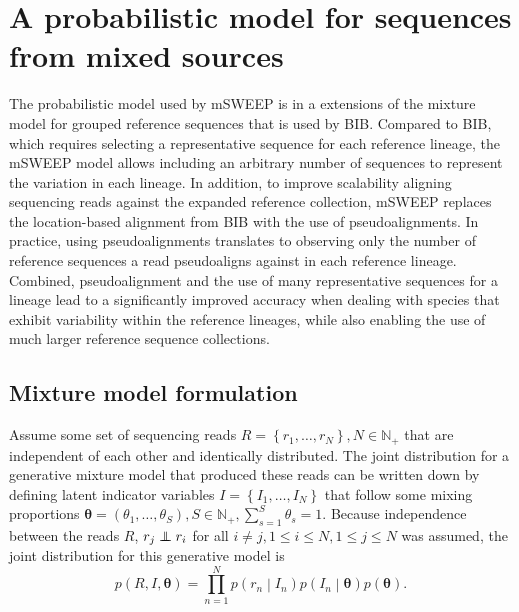\documentclass[officiallayout]{tktla}
\newcommand\indept{\protect\mathpalette{\protect\independenT}{\perp}}
\def\independenT#1#2{\mathrel{\rlap{$#1#2$}\mkern2mu{#1#2}}}
\begin{document}
\section{A probabilistic model for sequences from mixed sources}
\label{section:model}

The probabilistic model used by mSWEEP is in a extensions of the
mixture model for grouped reference sequences that is used by
BIB. Compared to BIB, which requires selecting a representative
sequence for each reference lineage, the mSWEEP model allows including
an arbitrary number of sequences to represent the variation in each
lineage. In addition, to improve scalability aligning sequencing reads
against the expanded reference collection, mSWEEP replaces the
location-based alignment from BIB with the use of pseudoalignments. In
practice, using pseudoalignments translates to observing only the
number of reference sequences a read pseudoaligns against in each
reference lineage. Combined, pseudoalignment and the use of many
representative sequences for a lineage lead to a significantly
improved accuracy when dealing with species that exhibit variability
within the reference lineages, while also enabling the use of much
larger reference sequence collections.

\subsection{Mixture model formulation}

Assume some set of sequencing reads $R = \left\{r_{1}, \dots,
r_{N}\right\}, N \in \mathbb{N}_{+}$ that are independent of each
other and identically distributed. The joint distribution for a
generative mixture model that produced these reads can be written down
by defining latent indicator variables $I = \left\{I_{1}, \dots,
I_{N}\right\}$ that follow some mixing proportions
$\boldsymbol{\theta} = \left(\theta_{1}, \dots, \theta_{S}\right), S
\in \mathbb{N}_{+}, \sum_{s = 1}^{S} \theta_{s} = 1$. Because
independence between the reads $R$, $r_{j} \indept r_{i}$ for all $i
\neq j, 1 \leq i \leq N, 1 \leq j \leq N$ was assumed, the joint
distribution for this generative model is
\begin{equation}
  \label{model:joint-distribution}
  p\left(R, I, \boldsymbol\theta\right) = \prod_{n = 1}^{N}p\left(r_{n} \middle| I_{n}\right) p\left(I_{n} \middle| \boldsymbol\theta\right)p\left(\boldsymbol\theta\right).
\end{equation}
\end{document}
